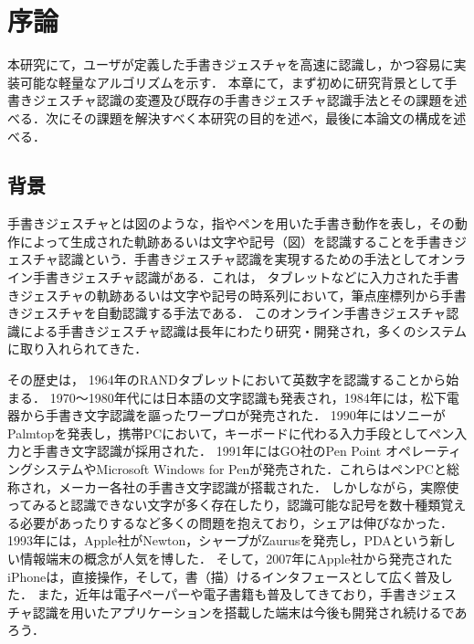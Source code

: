 \chapter{序論}
本研究にて，ユーザが定義した手書きジェスチャを高速に認識し，かつ容易に実装可能な軽量なアルゴリズムを示す．
本章にて，まず初めに研究背景として手書きジェスチャ認識の変遷及び既存の手書きジェスチャ認識手法とその課題を述べる．次にその課題を解決すべく本研究の目的を述べ，最後に本論文の構成を述べる．

\section{背景}
手書きジェスチャとは図のような，指やペンを用いた手書き動作を表し，その動作によって生成された軌跡あるいは文字や記号（図）を認識することを手書きジェスチャ認識という．手書きジェスチャ認識を実現するための手法としてオンライン手書きジェスチャ認識がある．これは，
タブレットなどに入力された手書きジェスチャの軌跡あるいは文字や記号の時系列において，筆点座標列から手書きジェスチャを自動認識する手法である．
このオンライン手書きジェスチャ認識による手書きジェスチャ認識は長年にわたり研究・開発され，多くのシステムに取り入れられてきた．

その歴史は，
1964年のRANDタブレットにおいて英数字を認識することから始まる．
1970〜1980年代には日本語の文字認識も発表され，1984年には，松下電器から手書き文字認識を謳ったワープロが発売された．
1990年にはソニーがPalmtopを発表し，携帯PCにおいて，キーボードに代わる入力手段としてペン入力と手書き文字認識が採用された．
1991年にはGO社のPen Point オペレーティングシステムやMicrosoft Windows for Penが発売された．これらはペンPCと総称され，メーカー各社の手書き文字認識が搭載された．
しかしながら，実際使ってみると認識できない文字が多く存在したり，認識可能な記号を数十種類覚える必要があったりするなど多くの問題を抱えており，シェアは伸びなかった．
1993年には，Apple社がNewton，シャープがZaurusを発売し，PDAという新しい情報端末の概念が人気を博した．
そして，2007年にApple社から発売されたiPhoneは，直接操作，そして，書（描）けるインタフェースとして広く普及した．
また，近年は電子ペーパーや電子書籍も普及してきており，手書きジェスチャ認識を用いたアプリケーションを搭載した端末は今後も開発され続けるであろう．

